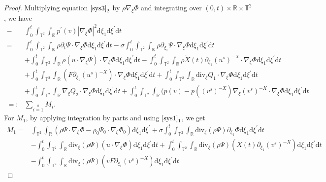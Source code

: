 \documentclass[10pt,reqno]{amsart}
\numberwithin{equation}{section}
\newcommand{\dif}{\mathrm{d}}
\newcommand{\ddiv}{\mathrm{div}}
\begin{document}
\begin{proof}
Multiplying equation $\eqref{sys3}_2$ by $\rho\nabla_\xi\Phi$ and integrating over $(0, t)\times\mathbb{R}\times\mathbb{T}^2$, we have
\begin{align*}
-&\int_0^t\int_{\mathbb{T}^2}\int_{\mathbb{R}}p^\prime(v)|\nabla_\xi\Phi|^2\dif \xi_1\dif \xi^{\prime}\dif t\\
=&\int_0^t\int_{\mathbb{T}^2}\int_{\mathbb{R}}
\rho\partial_t\Psi
\cdot\nabla_\xi\Phi\dif \xi_1\dif \xi^{\prime}\dif t
-\sigma\int_0^t\int_{\mathbb{T}^2}\int_{\mathbb{R}}
\rho\partial_{\xi_1}\Psi
\cdot\nabla_\xi\Phi\dif \xi_1\dif \xi^{\prime}\dif t\\
&+\int_0^t\int_{\mathbb{T}^2}\int_{\mathbb{R}}
        \rho( u\cdot\nabla_\xi\Psi)
\cdot\nabla_\xi\Phi\dif \xi_1\dif \xi^{\prime}\dif t
-\int_0^t\int_{\mathbb{T}^2}\int_{\mathbb{R}}
    \rho \dot{X}(t)\partial_{\xi_1}(u^s)^{-X}
\cdot\nabla_\xi\Phi\dif \xi_1\dif \xi^{\prime}\dif t\\
&+\int_0^t\int_{\mathbb{T}^2}\int_{\mathbb{R}}
        (F\partial_{\xi_1}(u^s)^{-X})
\cdot\nabla_\xi\Phi\dif \xi_1\dif \xi^{\prime}\dif t
+\int_0^t\int_{\mathbb{T}^2}\int_{\mathbb{R}}
    \ddiv_\xi Q_1
\cdot\nabla_\xi\Phi\dif \xi_1\dif \xi^{\prime}\dif t\\
&+\int_0^t\int_{\mathbb{T}^2}\int_{\mathbb{R}}
     \nabla_\xi Q_2
\cdot\nabla_\xi\Phi\dif \xi_1\dif \xi^{\prime}\dif t
+\int_0^t\int_{\mathbb{T}^2}\int_{\mathbb{R}}
(p(v)-p((v^s)^{-X})\nabla_\xi(v^s)^{-X}\cdot\nabla_\xi\Phi
\dif \xi_1\dif \xi^{\prime}\dif t\\
=:&\sum\limits_{i=1}\limits^8M_i.
\end{align*}
For $M_1$, by applying integration by parts and using $\eqref{sys1}_1$, we get
\begin{align*}
M_1
=&\int_{\mathbb{T}^2}\int_{\mathbb{R}}
\left(\rho\Psi
\cdot\nabla_\xi\Phi-\rho_0\Psi_0
\cdot\nabla_\xi\Phi_0\right)\dif \xi_1\dif \xi^{\prime}
+\sigma\int_0^t\int_{\mathbb{T}^2}\int_{\mathbb{R}}
\ddiv_\xi(\rho\Psi) \partial_{\xi_1}\Phi
\dif \xi_1\dif \xi^{\prime}\dif t\\
&-\int_0^t\int_{\mathbb{T}^2}\int_{\mathbb{R}}
\ddiv_\xi(\rho\Psi)  (u\cdot\nabla_\xi\Phi)
        \dif \xi_1\dif \xi^{\prime}\dif t
+\int_0^t\int_{\mathbb{T}^2}\int_{\mathbb{R}}
  \ddiv_\xi(\rho\Psi)  (\dot{X}(t)\partial_{\xi_1}(v^s)^{-X})
    \dif \xi_1\dif \xi^{\prime}\dif t\\
&-\int_0^t\int_{\mathbb{T}^2}\int_{\mathbb{R}}
      \ddiv_\xi(\rho\Psi)  (vF\partial_{\xi_1}(v^s)^{-X})
        \dif \xi_1\dif \xi^{\prime}\dif t

\end{align*}
\end{proof}
\end{document}
